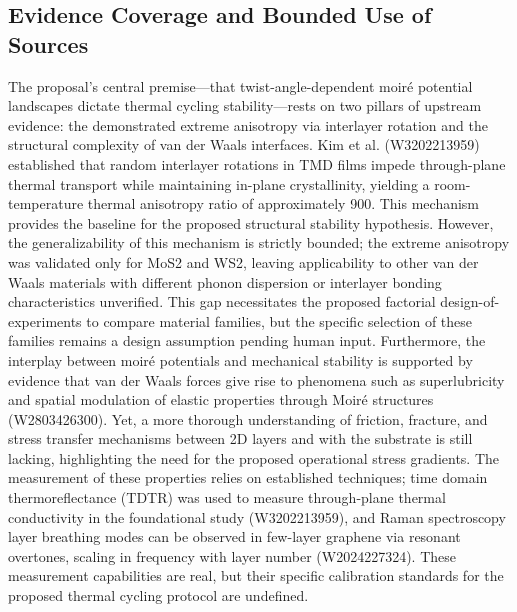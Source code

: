 \documentclass[conference]{IEEEtran}
\begin{document}
\subsection{Evidence Coverage and Bounded Use of Sources}
The proposal's central premise---that twist-angle-dependent moiré potential landscapes dictate thermal cycling stability---rests on two pillars of upstream evidence: the demonstrated extreme anisotropy via interlayer rotation and the structural complexity of van der Waals interfaces. Kim et al. (W3202213959) established that random interlayer rotations in TMD films impede through-plane thermal transport while maintaining in-plane crystallinity, yielding a room-temperature thermal anisotropy ratio of approximately 900. This mechanism provides the baseline for the proposed structural stability hypothesis. However, the generalizability of this mechanism is strictly bounded; the extreme anisotropy was validated only for MoS2 and WS2, leaving applicability to other van der Waals materials with different phonon dispersion or interlayer bonding characteristics unverified. This gap necessitates the proposed factorial design-of-experiments to compare material families, but the specific selection of these families remains a design assumption pending human input. Furthermore, the interplay between moiré potentials and mechanical stability is supported by evidence that van der Waals forces give rise to phenomena such as superlubricity and spatial modulation of elastic properties through Moiré structures (W2803426300). Yet, a more thorough understanding of friction, fracture, and stress transfer mechanisms between 2D layers and with the substrate is still lacking, highlighting the need for the proposed operational stress gradients. The measurement of these properties relies on established techniques; time domain thermoreflectance (TDTR) was used to measure through-plane thermal conductivity in the foundational study (W3202213959), and Raman spectroscopy layer breathing modes can be observed in few-layer graphene via resonant overtones, scaling in frequency with layer number (W2024227324). These measurement capabilities are real, but their specific calibration standards for the proposed thermal cycling protocol are undefined.~\cite{cite_26ecaf73d88dfe33,cite_6b49ace365c37cc5}
\end{document}
